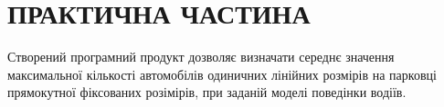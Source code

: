 \chapter{ПРАКТИЧНА ЧАСТИНА} 
\hspace{10pt}

Створений програмний продукт дозволяє визначати середнє значення максимальної кількості автомобілів  одиничних лінійних розмірів на парковці прямокутної фіксованих розімірів, при заданій моделі поведінки водіїв.


